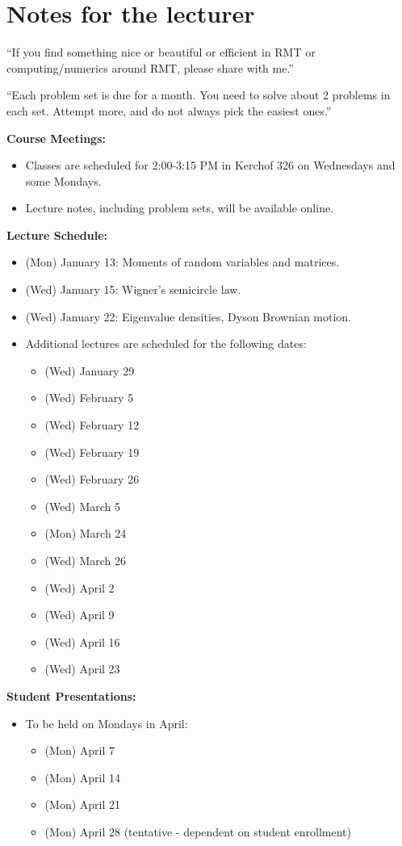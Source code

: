 \documentclass[letterpaper,11pt,oneside,reqno]{article}
\numberwithin{equation}{section}
\theoremstyle{definition}
\newenvironment{lnotes}{\section*{Notes for the lecturer}}{}
\begin{document}
\begin{lnotes}

``If you find something nice or beautiful or efficient in
RMT or computing/numerics around RMT, please share with me.''

\medskip

``Each problem set is due for a month.
You need to solve about 2 problems in each set. Attempt more,
and do not always pick the easiest ones.''

\medskip


\textbf{Course Meetings:}
\begin{itemize}
				\item Classes are scheduled for 2:00-3:15 PM in Kerchof 326 on Wednesdays and some Mondays.
				\item Lecture notes, including problem sets, will be available online.
\end{itemize}

\textbf{Lecture Schedule:}
\begin{itemize}
				\item (Mon) January 13: Moments of random variables and matrices.
				\item (Wed) January 15: Wigner's semicircle law.
				\item (Wed) January 22: Eigenvalue densities, Dyson Brownian motion.
				\item Additional lectures are scheduled for the following dates:
				\begin{itemize}
								\item (Wed) January 29
								\item (Wed) February 5
								\item (Wed) February 12
								\item (Wed) February 19
								\item (Wed) February 26
								\item (Wed) March 5
								\item (Mon) March 24
								\item (Wed) March 26
								\item (Wed) April 2
								\item (Wed) April 9
								\item (Wed) April 16
								\item (Wed) April 23
				\end{itemize}
\end{itemize}

\textbf{Student Presentations:}
\begin{itemize}
				\item To be held on Mondays in April:
				\begin{itemize}
								\item (Mon) April 7
								\item (Mon) April 14
								\item (Mon) April 21
								\item (Mon) April 28 (tentative - dependent on student enrollment)
				\end{itemize}
\end{itemize}


\end{lnotes}
\end{document}
